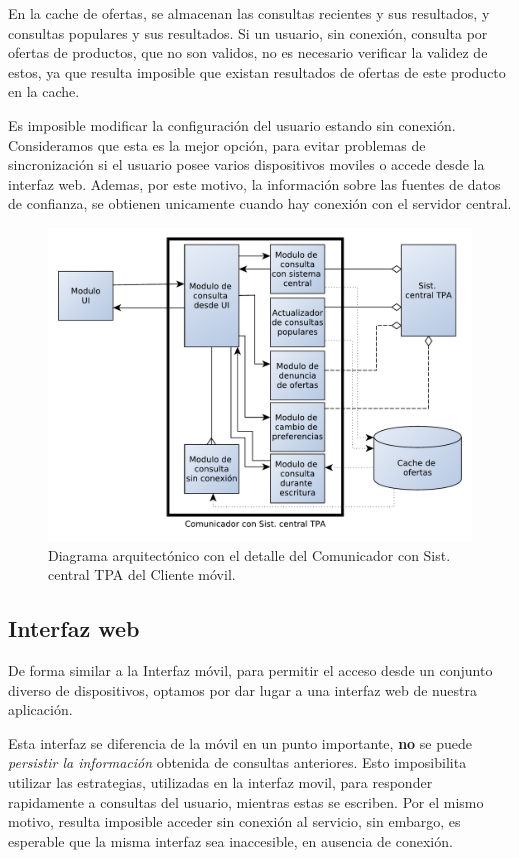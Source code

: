 En la \textsf{cache de ofertas}, se almacenan las consultas recientes y sus resultados, y consultas populares y sus resultados. Si un usuario, sin conexión, consulta por ofertas de productos, que no son validos, no es necesario verificar la validez de estos, ya que resulta imposible que existan resultados de ofertas de este producto en la cache.

Es imposible modificar la configuración del usuario estando sin conexión. Consideramos que esta es la mejor opción, para evitar problemas de sincronización si el usuario posee varios dispositivos moviles o accede desde la interfaz web. Ademas, por este motivo, la información sobre las fuentes de datos de confianza, se obtienen unicamente cuando hay conexión con el servidor central.

\begin{figure}[H]
	\centering
	\includegraphics[width=\textwidth]{graficos/arch/cliente_movil_comunicador.pdf}
	\caption{Diagrama arquitectónico con el detalle del \textsf{Comunicador con Sist. central TPA} del \textsf{Cliente móvil}.}
\end{figure}

\subsection{Interfaz web}

De forma similar a la Interfaz móvil, para permitir el acceso desde un conjunto diverso de dispositivos, optamos por dar lugar a una interfaz web de nuestra aplicación.

Esta interfaz se diferencia de la móvil en un punto importante, \textbf{no} se puede \emph{persistir la información} obtenida de consultas anteriores. Esto imposibilita utilizar las estrategias, utilizadas en la interfaz movil, para responder rapidamente a consultas del usuario, mientras estas se escriben. Por el mismo motivo, resulta imposible acceder sin conexión al servicio, sin embargo, es esperable que la misma interfaz sea inaccesible, en ausencia de conexión.


